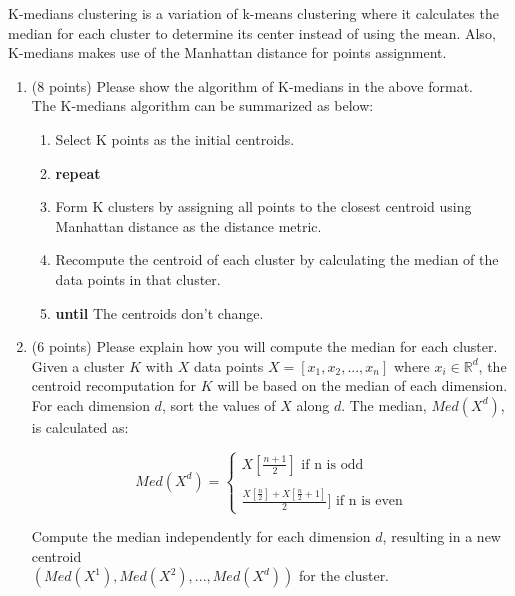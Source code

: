 \documentclass[11pt]{article}
\begin{document}
\begin{enumerate}
    K-medians clustering is a variation of k-means clustering
    where it calculates the median for each cluster to determine
    its center instead of using the mean. Also, K-medians makes
    use of the Manhattan distance for points assignment.
    
    \begin{enumerate}
        \item (8 points) Please show the algorithm of K-medians
        in the above format.\\

            The K-medians algorithm can be summarized as below:
            \begin{enumerate}
                \item Select K points as the initial centroids.
                \item \textbf{repeat}
                \item \;\;\;\; Form K clusters by assigning all points to the closest centroid using Manhattan distance as the distance metric.
                \item \;\;\;\; Recompute the centroid of each cluster by calculating the median of the data points in that cluster.
                \item \textbf{until} The centroids don't change.\\
            \end{enumerate}

        

        \item (6 points) Please explain how you will compute the median
        for each cluster.\\

        Given a cluster $K$ with $X$ data points $X = [x_1, x_2, ... , x_n]$ where $x_i \in \mathbb{R}^d$, the centroid recomputation for $K$ will be based on the median of each dimension.\\

        For each dimension $d$, sort the values of $X$ along $d$. The median, $Med(X^d)$, is calculated as:
        
        \[Med(X^d) = \begin{cases}
         X [\frac{n+1}{2}] \text{ if n is odd} \\\\
         \frac{X[\frac{n}{2}] + X[\frac{n}{2} + 1]}{2}] \text{ if n is even}
        \end{cases}\]

        Compute the median independently for each dimension $d$, resulting in a new centroid \\
        $(Med(X^1), Med(X^2),..., Med(X^d))$ for the cluster.\\



\end{enumerate}
\end{enumerate}
\end{document}

